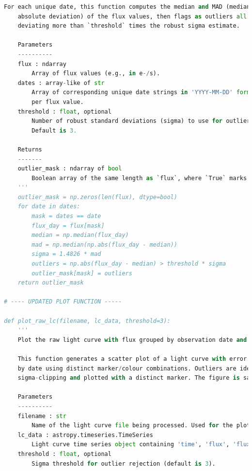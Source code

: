 \documentclass[a4paper,12pt]{article}
\newenvironment{solution}{}{}
\begin{document}
\begin{enumerate}
\begin{solution}
\begin{lstlisting}[language=python]
    For each unique date, this function computes the median and MAD (median
    absolute deviation) of the flux values, then flags as outliers all points 
    deviating more than `threshold` times the robust sigma estimate.

    Parameters
    ----------
    flux : ndarray
        Array of flux values (e.g., in e-/s).
    dates : array-like of str
        Array of corresponding unique date strings in 'YYYY-MM-DD' format, one
        per flux value.
    threshold : float, optional
        Number of robust standard deviations (sigma) to use for outlier rejection.
        Default is 3.

    Returns
    -------
    outlier_mask : ndarray of bool
        Boolean array of the same length as `flux`, where `True` marks an outlier.
    '''
    outlier_mask = np.zeros(len(flux), dtype=bool)
    for date in dates:
        mask = dates == date
        flux_day = flux[mask]
        median = np.median(flux_day)
        mad = np.median(np.abs(flux_day - median))
        sigma = 1.4826 * mad
        outliers = np.abs(flux_day - median) > threshold * sigma
        outlier_mask[mask] = outliers
    return outlier_mask

# ---- UPDATED PLOT FUNCTION -----

def plot_raw_lc(filename, lc_data, threshold=3):
    '''
    Plot the raw light curve with flux grouped by observation date and annotated outliers.

    This function generates a scatter plot of a light curve with error bars, grouping points
    by date using distinct marker/colour combinations. Outliers are identified using
    sigma-clipping and plotted with a distinct marker. The figure is saved to a PDF file.

    Parameters
    ----------
    filename : str
        Name of the light curve file being processed. Used for the plot title and output filename.
    lc_data : astropy.timeseries.TimeSeries
        Light curve time series object containing 'time', 'flux', 'flux_err', and 'date' columns.
    threshold : float, optional
        Sigma threshold for outlier rejection (default is 3).
    

\end{lstlisting}
\end{solution}
\end{enumerate}
\end{document}
